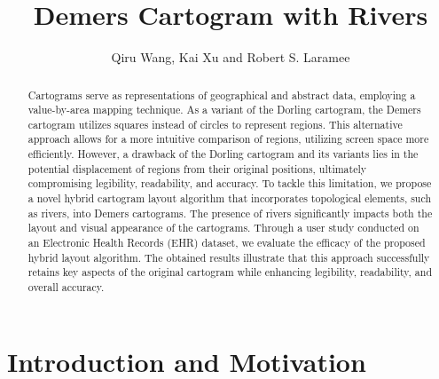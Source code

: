 \documentclass[Afour,sagev,times]{sagej}
\begin{document}
\title{Demers Cartogram with Rivers}

\author{Qiru Wang, Kai Xu and Robert S. Laramee}



\begin{abstract}
    Cartograms serve as representations of geographical and abstract data, employing a value-by-area mapping technique.
    As a variant of the Dorling cartogram, the Demers cartogram utilizes squares instead of circles to represent regions.
    This alternative approach allows for a more intuitive comparison of regions, utilizing screen space more efficiently.
    However, a drawback of the Dorling cartogram and its variants lies in the potential displacement of regions from their original positions, ultimately compromising legibility, readability, and accuracy.
    To tackle this limitation, we propose a novel hybrid cartogram layout algorithm that incorporates topological elements, such as rivers, into Demers cartograms.
    The presence of rivers significantly impacts both the layout and visual appearance of the cartograms.
    Through a user study conducted on an Electronic Health Records (EHR) dataset, we evaluate the efficacy of the proposed hybrid layout algorithm.
    The obtained results illustrate that this approach successfully retains key aspects of the original cartogram while enhancing legibility, readability, and overall accuracy.
\end{abstract}


\maketitle

\section{Introduction and Motivation}
\end{document}
